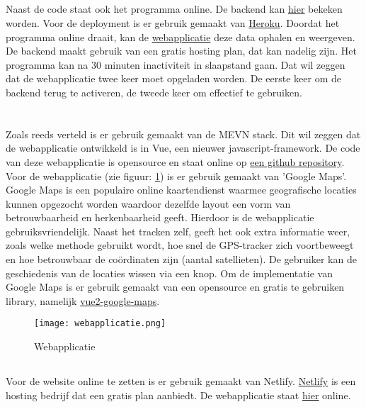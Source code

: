 \subsection{}
Naast de code staat ook het programma online. De backend kan \href{https://indy-bap-backend.herokuapp.com/api/locations}{\underline{hier}} bekeken worden. Voor de deployment is er gebruik gemaakt van \href{www.heroku.com}{Heroku}. Doordat het programma online draait, kan de \href{https://indy-bap-frontend.netlify.com/}{webapplicatie} deze data ophalen en weergeven.
\newline
De backend maakt gebruik van een gratis hosting plan, dat kan nadelig zijn. Het programma kan na 30 minuten inactiviteit in slaapstand gaan. Dat wil zeggen dat de webapplicatie twee keer moet opgeladen worden. De eerste keer om de backend terug te activeren, de tweede keer om effectief te gebruiken.
\pagebreak
\section{}
\label{ch:frontend}

\subsection{}
Zoals reeds verteld is er gebruik gemaakt van de MEVN stack. Dit wil zeggen dat de webapplicatie ontwikkeld is in Vue, een nieuwer javascript-framework. De code van deze webapplicatie is opensource en staat online op \href{https://github.com/IndyVC/bap-frontend}{een github repository}.
\newline
Voor de webapplicatie (zie figuur: \ref{fig:webapplicatie}) is er gebruik gemaakt van 'Google Maps'. Google Maps is een populaire online kaartendienst waarmee geografische locaties kunnen opgezocht worden waardoor dezelfde layout een vorm van betrouwbaarheid en herkenbaarheid geeft. Hierdoor is de webapplicatie gebruiksvriendelijk. Naast het tracken zelf, geeft het ook extra informatie weer, zoals welke methode gebruikt wordt, hoe snel de GPS-tracker zich voortbeweegt en hoe betrouwbaar de coördinaten zijn (aantal satellieten). De gebruiker kan de geschiedenis van de locaties wissen via een knop.
\newline
Om de implementatie van Google Maps is er gebruik gemaakt van een opensource en gratis te gebruiken library, namelijk \href{https://www.npmjs.com/package/vue2-google-maps}{vue2-google-maps}.
\begin{figure}
	\texttt{[image: webapplicatie.png]}
	\caption{Webapplicatie}
	\label{fig:webapplicatie}
\end{figure}

\subsection{}
Voor de website online te zetten is er gebruik gemaakt van Netlify. \href{https://www.netlify.com/}{Netlify} is een hosting bedrijf dat een gratis plan aanbiedt. De webapplicatie staat \href{https://indy-bap-frontend.netlify.com/}{\underline{hier}} online.